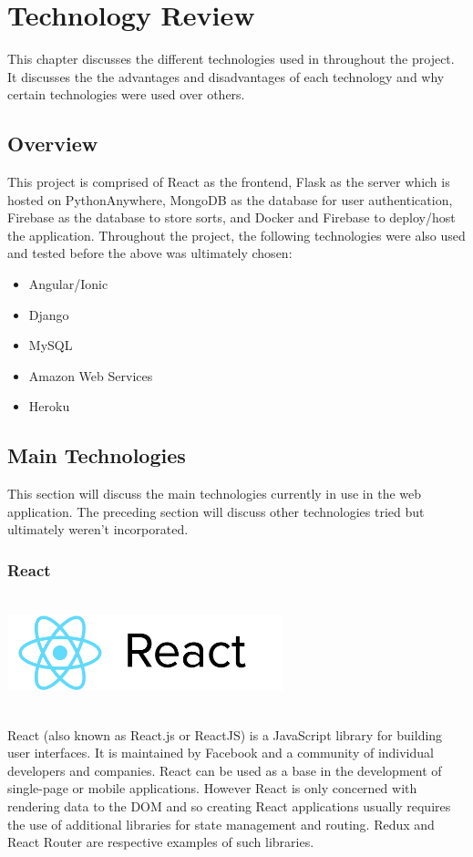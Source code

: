 \chapter{Technology Review}
This chapter discusses the different technologies used in throughout the
project. It discusses the the advantages and disadvantages of each technology 
and why certain technologies were used over others.

\section{Overview}
This project is comprised of React as the frontend, Flask as the server which is
hosted on PythonAnywhere, MongoDB as the database for user authentication, Firebase as the database to store sorts, and Docker and Firebase to deploy/host the application. Throughout the project, the following technologies were also used 
and tested before the above was ultimately chosen:
\begin{itemize}
    \item Angular/Ionic
    \item Django
    \item MySQL
    \item Amazon Web Services
    \item Heroku
\end{itemize}

\newpage
\section{Main Technologies}
This section will discuss the main technologies currently in use in the web 
application. The preceding section will discuss other technologies tried but 
ultimately weren't incorporated. 

\subsection{React}
\par
\medskip
\begin{center}
    \includegraphics[width=8cm,height=3.3cm,keepaspectratio]{images/react}
\end{center}
React (also known as React.js or ReactJS) is a JavaScript library for building 
user interfaces. It is maintained by Facebook and a community of individual 
developers and companies.
\bigskip
React can be used as a base in the development of single-page or mobile 
applications. However React is only concerned with rendering data to the DOM and
so creating React applications usually requires the use of additional libraries 
for state management and routing. Redux and React Router are respective examples
of such libraries. 


